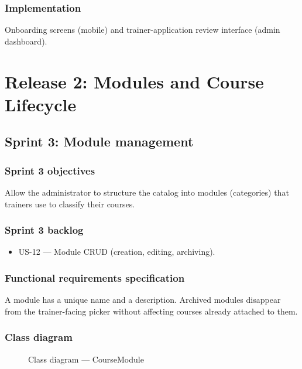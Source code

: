 \documentclass[a4paper,12pt]{report}
\begin{document}
\subsection{Implementation}
Onboarding screens (mobile) and trainer-application review interface
(admin dashboard).

\chapter{Release 2: Modules and Course Lifecycle}

\section{Sprint 3: Module management}

\subsection{Sprint 3 objectives}
Allow the administrator to structure the catalog into modules
(categories) that trainers use to classify their courses.

\subsection{Sprint 3 backlog}
\begin{itemize}[leftmargin=*]
  \item US-12 --- Module CRUD (creation, editing, archiving).
\end{itemize}

\subsection{Functional requirements specification}
A module has a unique name and a description. Archived modules disappear
from the trainer-facing picker without affecting courses already attached
to them.

\subsection{Class diagram}
\begin{figure}[H]
\centering
\caption{Class diagram --- CourseModule}
\end{figure}
\end{document}
